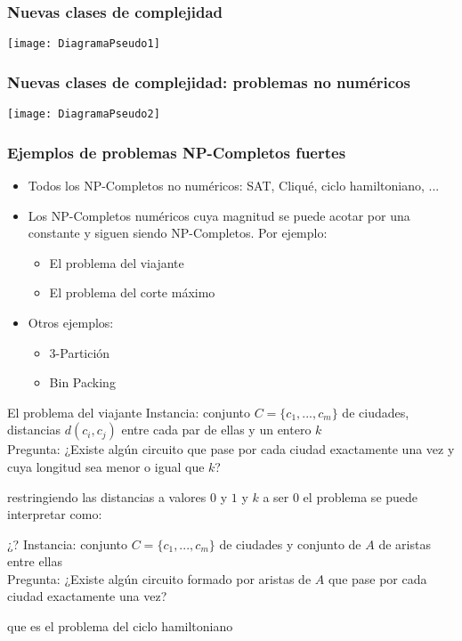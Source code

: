 \documentclass{beamer}
\begin{document}
\begin{frame}
	\frametitle{Nuevas clases de complejidad}
	\texttt{[image: DiagramaPseudo1]}
\end{frame}

\begin{frame}
	\frametitle{Nuevas clases de complejidad: problemas no numéricos}
	\texttt{[image: DiagramaPseudo2]}
\end{frame}

\begin{frame}
	\frametitle{Ejemplos de problemas NP-Completos fuertes}
	\begin{itemize}
		\item Todos los NP-Completos no numéricos: SAT, Cliqué, ciclo hamiltoniano, ...
		\item Los NP-Completos numéricos cuya magnitud se puede acotar por una constante y siguen siendo NP-Completos. Por ejemplo:
		\begin{itemize}
			\item El problema del viajante
			\item El problema del corte máximo
		\end{itemize}
	    \item Otros ejemplos: 
	    \begin{itemize}
	    	\item 3-Partición
	    	\item Bin Packing
	    \end{itemize} 
	\end{itemize}

\end{frame}

\begin{frame}
	\begin{block}{El problema del viajante}
		Instancia: conjunto $C = \{c_1,...,c_m\}$ de ciudades, distancias $d(c_i, c_j)$ entre cada par de ellas y un entero $k$\\
		Pregunta: ¿Existe algún circuito que pase por cada ciudad exactamente una vez y cuya longitud sea menor o igual que $k$?\\
	\end{block}
     restringiendo las distancias a valores $0$ y $1$ y $k$ a ser $0$ el problema se puede interpretar como: 
     \begin{block}{¿?} 
     	Instancia: conjunto $ C = \{c_1,...,c_m\}$ de ciudades y conjunto de $A$ de aristas entre ellas\\
     	Pregunta: ¿Existe algún circuito formado por aristas de $A$ que pase por cada ciudad exactamente una vez?
     \end{block}
     que es el \alert{problema del ciclo hamiltoniano}
\end{frame}
\end{document}
